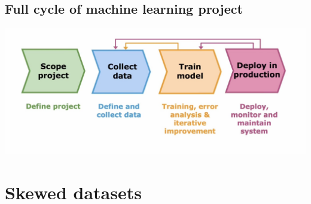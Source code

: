 \subsection*{Full cycle of machine learning project}
\includegraphics[width=\textwidth]{images/10.27}
\section{Skewed datasets}

